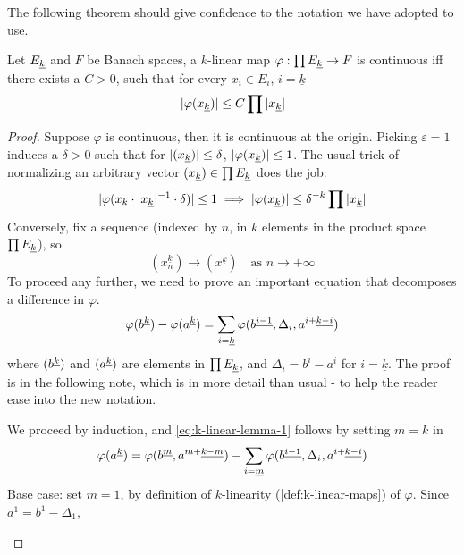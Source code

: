 \documentclass[../main-v2-manifolds.tex]{subfiles}
\begin{document}

The following theorem should give confidence to the notation we have adopted to use.
\begin{wts}
    Let $\UL{E}[k]$ and $F$ be Banach spaces, a $k$-linear map $\varphi: \prod \UL{E}[k]\to F$ is continuous iff there exists a $C>0$, such that for every $x_i\in E_i$, $i=\underline{k}$
    \[
        \abs{\varphi(\UL{x}[k])} \leq C\prod \abs{\UL{x}[k]}
    \]
\end{wts}
\begin{proof}
    Suppose $\varphi$ is continuous, then it is continuous at the origin. Picking $\varepsilon = 1$ induces a $\delta>0$ such that for $\abs{(\UL{x}[k])}\leq \delta$, $\abs{\varphi(\UL{x}[k])}\leq 1$. The usual trick of normalizing an arbitrary vector $(\UL{x}[k])\in \prod \UL{E}[k]$ does the job:
    \[
        \abs{\varphi(x_k\cdot \abs{\UL{x}[k]}^{-1}\cdot\delta)}\leq 1\implies \abs{\varphi(\UL{x}[k])}\leq \delta^{-k}\prod\abs{\UL{x}[k]}
    \]
    Conversely, fix a sequence (indexed by $n$, in $k$ elements in the product space $\prod\UL{E}[k]$), so
    \begin{equation}\label{eq:k-linear-sequence-def}
        (x_n^{\underline{k}})\to (x^{\underline{k}})\quad \text{as } n\to +\infty
    \end{equation}
    To proceed any further, we need to prove an important equation that decomposes a difference in $\varphi$.
    \begin{equation}\label{eq:k-linear-lemma-1}
        \varphi(\UPL{b}[k]) - \varphi(\UPL{a}[k]) = \sum_{i=\underline{k}}\varphi(\UPL{b}[i-1],\Delta_i, \UPL{a}[i+][k-i])
    \end{equation}
    where $(\UPL{b}[k])$ and $(\UPL{a}[k])$ are elements in $\prod \UL{E}[k]$, and $\Delta_i = b^i - a^i$ for $i = \underline{k}$. The proof is in the following note, which is in more detail than usual - to help the reader ease into the new notation.
    \begin{note}
        We proceed by induction, and \cref{eq:k-linear-lemma-1} follows by setting $m=k$ in
        \begin{equation}\label{eq:k-linear-lemma-2}
            \varphi(\UPL{a}[k]) = \varphi(\UPL{b}[m],\UPL{a}[m+][k-m]) - \sum_{i=\underline{m}}\varphi(\UPL{b}[i-1],\Delta_i,\UPL{a}[i+][k-i])
        \end{equation}
        Base case: set $m=1$, by definition of $k$-linearity (\cref{def:k-linear-maps}) of $\varphi$. Since $a^1 = b^1-\Delta_1$, 
        \[
\]
\end{note}
\end{proof}
\end{document}
